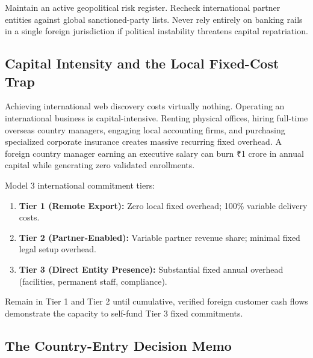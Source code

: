 Maintain an active geopolitical risk register. Recheck international partner entities against global sanctioned-party lists. Never rely entirely on banking rails in a single foreign jurisdiction if political instability threatens capital repatriation.

\subsection{Capital Intensity and the Local Fixed-Cost Trap}
\label{sec:capital_intensity_fixed_cost_trap}

Achieving international web discovery costs virtually nothing. Operating an international business is capital-intensive. Renting physical offices, hiring full-time overseas country managers, engaging local accounting firms, and purchasing specialized corporate insurance creates massive recurring fixed overhead. A foreign country manager earning an executive salary can burn ₹1 crore in annual capital while generating zero validated enrollments.

Model 3 international commitment tiers:
\begin{enumerate}
\item \textbf{Tier 1 (Remote Export):} Zero local fixed overhead; 100\% variable delivery costs.
\item \textbf{Tier 2 (Partner-Enabled):} Variable partner revenue share; minimal fixed legal setup overhead.
\item \textbf{Tier 3 (Direct Entity Presence):} Substantial fixed annual overhead (facilities, permanent staff, compliance).
\end{enumerate}
Remain in Tier 1 and Tier 2 until cumulative, verified foreign customer cash flows demonstrate the capacity to self-fund Tier 3 fixed commitments.

\subsection{The Country-Entry Decision Memo}
\label{sec:country_entry_decision_memo}

